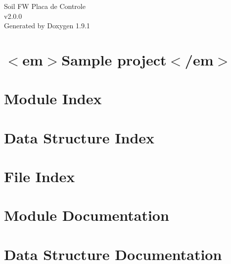 \let\mypdfximage\pdfximage\def\pdfximage{\immediate\mypdfximage}\documentclass[twoside]{book}
\newcommand{\+}{\discretionary{\mbox{\scriptsize$\hookleftarrow$}}{}{}}
\newcommand{\clearemptydoublepage}{%
  \newpage{\pagestyle{empty}\cleardoublepage}%
}
\begin{document}
\raggedbottom

\hypersetup{pageanchor=false,
             bookmarksnumbered=true,
             pdfencoding=unicode
            }
\begin{titlepage}
\vspace*{7cm}
\begin{center}%
{\Large Soil FW Placa de Controle \\[1ex]\large v2.\+0.\+0 }\\
\vspace*{1cm}
{\large Generated by Doxygen 1.9.1}\\
\end{center}
\end{titlepage}
\clearemptydoublepage
{}
\tableofcontents
\clearemptydoublepage
{}
\hypersetup{pageanchor=true}

\chapter{$<$em$>$Sample project$<$/em$>$}
\label{md__r_e_a_d_m_e}

\chapter{Module Index}

\chapter{Data Structure Index}

\chapter{File Index}

\chapter{Module Documentation}


\chapter{Data Structure Documentation}






\end{document}
